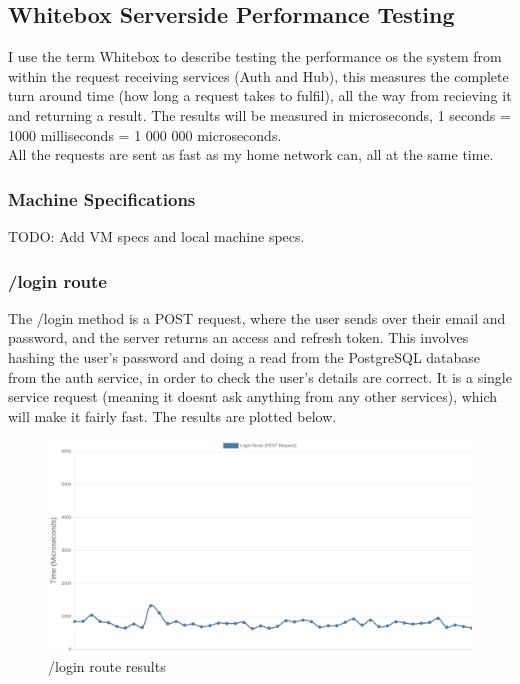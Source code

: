 \documentclass[titlepage]{article}
\begin{document}
\subsection{Whitebox Serverside Performance Testing}
I use the term Whitebox to describe testing the performance os the system from within the request receiving services (Auth and Hub), this measures the complete turn around time (how long a request takes to fulfil), all the way from recieving it and returning a result. The results will be measured in microseconds, 1 seconds = 1000 milliseconds = 1 000 000 microseconds. \\

All the requests are sent as fast as my home network can, all at the same time.

\subsubsection{Machine Specifications}
TODO: Add VM specs and local machine specs.

\pagebreak
\subsubsection{/login route}
The /login method is a POST request, where the user sends over their email and password, and the server returns an access and refresh token. This involves hashing the user's password and doing a read from the PostgreSQL database from the auth service, in order to check the user's details are correct. It is a single service request (meaning it doesnt ask anything from any other services), which will make it fairly fast. The results are plotted below.

\begin{figure}[h!]
\includegraphics[width=\textwidth]{../results/login.png}
  \caption{/login route results}
\end{figure}
\end{document}
